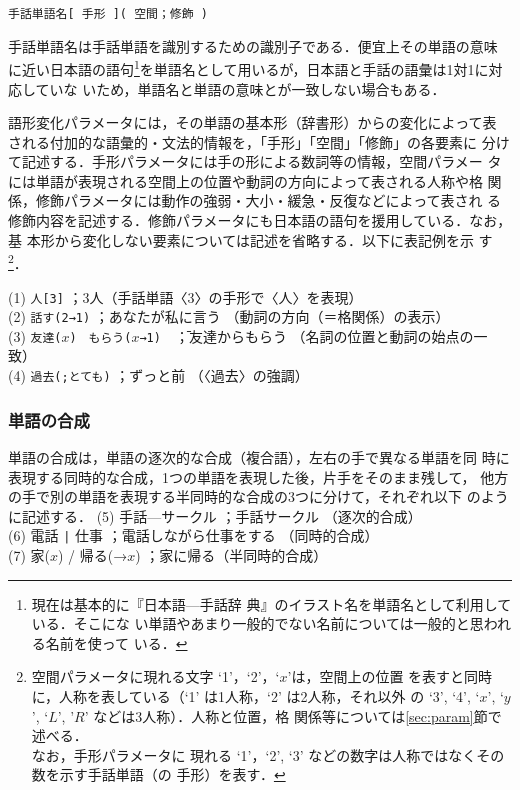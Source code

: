 \documentclass[japanese]{jnlp_1.4}
\newenvironment{ex}{}{}
\newenvironment{format}{}{}
\begin{document}
\vspace{-0.5\baselineskip}
\begin{format}
  \texttt{手話単語名[ 手形 ]( 空間；修飾 )}
\end{format}
\vspace{-0.5\baselineskip}

手話単語名は手話単語を識別するための識別子である．便宜上その単語の意味
に近い日本語の語句\footnote{現在は基本的に『日本語—手話辞
  典』\cite{JISLS1997}のイラスト名を単語名として利用している．そこにな
  い単語やあまり一般的でない名前については一般的と思われる名前を使って
  いる．}を単語名として用いるが，日本語と手話の語彙は1対1に対応していな
いため，単語名と単語の意味とが一致しない場合もある．

語形変化パラメータには，その単語の基本形（辞書形）からの変化によって表
される付加的な語彙的・文法的情報を，「手形」「空間」「修飾」の各要素に
分けて記述する．手形パラメータには手の形による数詞等の情報，空間パラメー
タには単語が表現される空間上の位置や動詞の方向によって表される人称や格
関係，修飾パラメータには動作の強弱・大小・緩急・反復などによって表され
る修飾内容を記述する．修飾パラメータにも日本語の語句を援用している．なお，基
本形から変化しない要素については記述を省略する．以下に表記例を示
す\footnote{空間パラメータに現れる文字 `1'，`2'，`$x$'は，空間上の位置
  を表すと同時に，人称を表している（`1' は1人称，`2' は2人称，それ以外
  の `3', `4', `$x$', `$y$', `$L$', '$R$' などは3人称）．人称と位置，格
  関係等については\ref{sec:param}節で述べる．\\ なお，手形パラメータに
  現れる `1'，`2', `3' などの数字は人称ではなくその数を示す手話単語（の
  手形）を表す．}．


\begin{ex}
  (1) \> \texttt{人[3]}   \> ；3人（手話単語〈3〉の手形で〈人〉を表現）  \\
  (2) \> {\tt 話す(2→1)} \> ；あなたが私に言う
  （動詞の方向（＝格関係）の表示）   \\
  (3) \> \texttt{友達($x$)　もらう($x$→1)}　\= ；友達からもらう
  （名詞の位置と動詞の始点の一致）   \\
  (4) \> {\tt 過去(;とても)} \> ；ずっと前 （〈過去〉の強調）
\end{ex}



\subsubsection{単語の合成}

単語の合成は，単語の逐次的な合成（複合語），左右の手で異なる単語を同
時に表現する同時的な合成，1つの単語を表現した後，片手をそのまま残して，
他方の手で別の単語を表現する半同時的な合成の3つに分けて，それぞれ以下
のように記述する．
\begin{ex}\noindent
(5) \> 手話—サークル \> ；手話サークル （逐次的合成） \\ 
(6) \> 電話 \verb+|+ 仕事  \> ；電話しながら仕事をする （同時的合成） \\
(7) \> 家($x$) / 帰る(→$x$) \> ；家に帰る（半同時的合成）
\end{ex}
\end{document}
